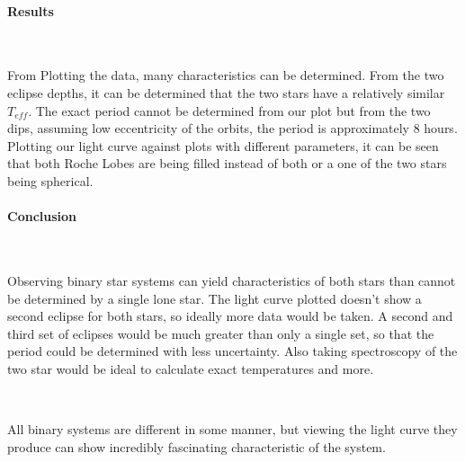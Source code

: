 \documentclass[12pt,twocolumn]{article}
\begin{document}
\paragraph{Results}

\ \

From Plotting the data, many characteristics can be determined. From the two eclipse depths, it can be determined that the two stars have a relatively similar $T_{eff}$. The exact period cannot be determined from our plot but from the two dips, assuming low eccentricity of the orbits, the period is approximately 8 hours. Plotting our light curve against plots with different parameters, it can be seen that both Roche Lobes are being filled instead of both or a one of the two stars being spherical.

\paragraph{Conclusion}

\ \

Observing binary star systems can yield characteristics of both stars than cannot be determined by a single lone star. The light curve plotted doesn't show a second eclipse for both stars, so ideally more data would be taken. A second and third set of eclipses would be much greater than only a single set, so that the period could be determined with less uncertainty. Also taking spectroscopy of the two star would be ideal to calculate exact temperatures and more.

\ \

All binary systems are different in some manner, but viewing the light curve they produce can show incredibly fascinating characteristic of the system.
\end{document}
